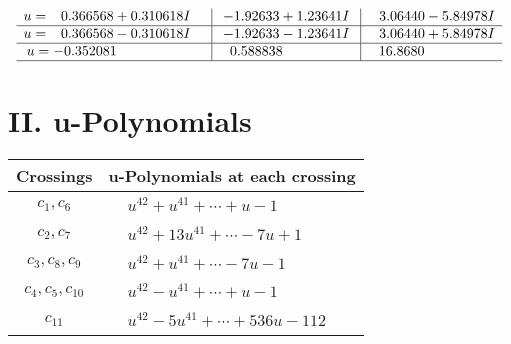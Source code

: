 \documentclass[1p]{elsarticle_modified}
\theoremstyle{definition}
\begin{document}
$$\begin{array}{c|c|c}
\begin{aligned}
u &= \phantom{-}0.366568 + 0.310618 I\end{aligned}
 & -1.92633 + 1.23641 I & \phantom{-}3.06440 - 5.84978 I \\ \hline\begin{aligned}
u &= \phantom{-}0.366568 - 0.310618 I\end{aligned}
 & -1.92633 - 1.23641 I & \phantom{-}3.06440 + 5.84978 I \\ \hline\begin{aligned}
u &= -0.352081\phantom{ +0.000000I}\end{aligned}
 & \phantom{-}0.588838\phantom{ +0.000000I} & \phantom{-}16.8680\phantom{ +0.000000I}\\
 \hline 
 \end{array}$$\newpage
\newpage\renewcommand{\arraystretch}{1}
\centering \section*{ II. u-Polynomials}
\begin{tabular}{m{50pt}|m{274pt}}
Crossings & \hspace{64pt}u-Polynomials at each crossing \\
\hline $$\begin{aligned}c_{1},c_{6}\end{aligned}$$&$\begin{aligned}
&u^{42}+u^{41}+\cdots+u-1
\end{aligned}$\\
\hline $$\begin{aligned}c_{2},c_{7}\end{aligned}$$&$\begin{aligned}
&u^{42}+13 u^{41}+\cdots-7 u+1
\end{aligned}$\\
\hline $$\begin{aligned}c_{3},c_{8},c_{9}\end{aligned}$$&$\begin{aligned}
&u^{42}+u^{41}+\cdots-7 u-1
\end{aligned}$\\
\hline $$\begin{aligned}c_{4},c_{5},c_{10}\end{aligned}$$&$\begin{aligned}
&u^{42}- u^{41}+\cdots+u-1
\end{aligned}$\\
\hline $$\begin{aligned}c_{11}\end{aligned}$$&$\begin{aligned}
&u^{42}-5 u^{41}+\cdots+536 u-112
\end{aligned}$\\
\hline
\end{tabular}\newpage\renewcommand{\arraystretch}{1}
\end{document}
